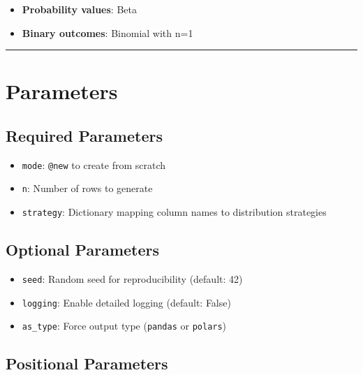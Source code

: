 \documentclass[
  letterpaper,
]{scrbook}
\providecommand{\tightlist}{%
  \setlength{\itemsep}{0pt}\setlength{\parskip}{0pt}}
\begin{document}
\begin{itemize}
\tightlist
\item
  \textbf{Probability values}: Beta
\item
  \textbf{Binary outcomes}: Binomial with n=1
\end{itemize}

\begin{center}\rule{0.5\linewidth}{0.5pt}\end{center}

\section{Parameters}\label{parameters-1}

\subsection{Required Parameters}\label{required-parameters-1}

\begin{itemize}
\tightlist
\item
  \texttt{mode}: \texttt{\textquotesingle{}@new\textquotesingle{}} to
  create from scratch
\item
  \texttt{n}: Number of rows to generate
\item
  \texttt{strategy}: Dictionary mapping column names to distribution
  strategies
\end{itemize}

\subsection{Optional Parameters}\label{optional-parameters-1}

\begin{itemize}
\tightlist
\item
  \texttt{seed}: Random seed for reproducibility (default: 42)
\item
  \texttt{logging}: Enable detailed logging (default: False)
\item
  \texttt{as\_type}: Force output type
  (\texttt{\textquotesingle{}pandas\textquotesingle{}} or
  \texttt{\textquotesingle{}polars\textquotesingle{}})
\end{itemize}

\subsection{Positional Parameters}\label{positional-parameters-1}
\end{document}
